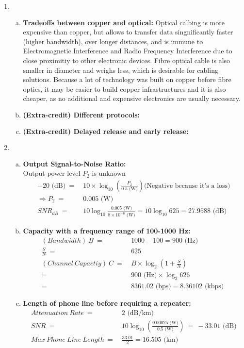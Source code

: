 \documentclass[11pt]{article}
\begin{document}
\begin{enumerate}[1.]
\item %
  \begin{enumerate}[(a)]
  \item \textbf{Tradeoffs between copper and optical:} 
  Optical calbing is more expensive than copper, but allows to transfer data singnificantly faster (higher bandwidth), over longer distances, and is immune to Electromagnetic Interference and Radio Frequency Interference due to close proximitiy to other electronic devices. Fibre optical cable is also smaller in diameter and weighs less, which is desirable for cabling solutions. Because a lot of technology was built on copper before fibre optics, it may be easier to build copper infrastructures and it is also cheaper, as no additional and expensive electronics are usually necessary.

  \item \textbf{(Extra-credit) Different protocols:}

  \item \textbf{(Extra-credit) Delayed release and early release:}
  \end{enumerate}

\item %
\begin{enumerate}[(a)]
\item \textbf{Output Signal-to-Noise Ratio:} \\
  Output power level $P_2$ is unknown
  \begin{align*}
  -20 \text{ (dB)}\ =&\ 10 \times \log_{10}\left(\frac{P_2}{0.5 \text{ (W)}}\right) \text{(Negative because it's a loss)}\\
  \Rightarrow P_2\ =&\ 0.005 \text{ (W)}\\
  SNR_{dB}\ =&\ 10 \log_{10}\frac{0.005 \text{ (W)}}{8\times10^{-6}\text{ (W)}} =  10\log_{10}625 = 27.9588\text{ (dB)}
  \end{align*}
\item \textbf{Capacity with a frequency range of 100-1000 Hz:}
  \begin{align*}
  (Bandwidth)\ B\ =&\ 1000 - 100 = 900 \text{ (Hz)} \\
  \frac{S}{N}\ =&\ 625 \\ 
  (Channel\ Capactiy)\ C\ =&\ B \times \log_{2}\left(1+\frac{S}{N}\right) \\
  =&\ 900\text{ (Hz)} \times \log_2 626 \\
  =&\ 8361.02\text{ (bps)} =  8.36102\text{ (kbps) }
  \end{align*}
\item \textbf{Length of phone line before requiring a repeater:} 
\begin{align*}
Attenuation\ Rate \ =&\ 2 \text{ (dB/km)} \\
SNR \ =&\ 10\log_{10}\left(\frac{0.00025 \text{ (W)}}{0.5 \text{ (W)}}\right) \ =\ -33.01 \text{ (dB)} \\
Max\ Phone\ Line\ Length \ =&\ \frac{33.01}{2} = 16.505 \text{ (km)}
\end{align*}
\end{enumerate}


\end{enumerate}
\end{document}
